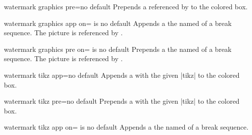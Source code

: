 \begin{docTcbKey}{watermark graphics pre}{=}{no default}
  Prepends a  referenced by  to the colored box.
\end{docTcbKey}

\begin{docTcbKey}{watermark graphics app on}{= is }{no default}
  Appends a  the named  of a break sequence.
  The picture is referenced by .
\end{docTcbKey}


\begin{docTcbKey}{watermark graphics pre on}{= is }{no default}
  Prepends a  the named  of a break sequence.
  The picture is referenced by .
\end{docTcbKey}


\begin{docTcbKey}{watermark tikz app}{=}{no default}
  Appends a  with the  given |tikz|  to the colored box.
\end{docTcbKey}

\begin{docTcbKey}{watermark tikz pre}{=}{no default}
  Prepends a  with the  given |tikz|  to the colored box.

\begin{dispExample}

\begin{tcolorbox}[enhanced,title=My title, watermark text=Watermark,
  smiley]
\lipsum[1-2]
\end{tcolorbox}
\end{dispExample}
\end{docTcbKey}

\begin{docTcbKey}{watermark tikz app on}{= is }{no default}
  Appends a  the named  of a break sequence.
\end{docTcbKey}

